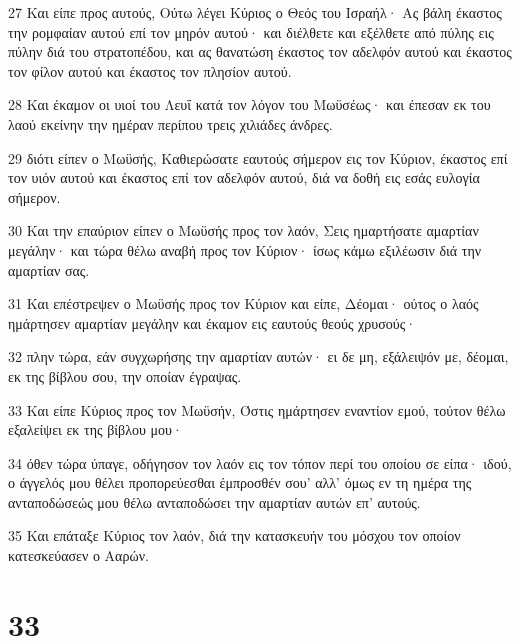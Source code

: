 \par 27 Και είπε προς αυτούς, Ούτω λέγει Κύριος ο Θεός του Ισραήλ· Ας βάλη έκαστος την ρομφαίαν αυτού επί τον μηρόν αυτού· και διέλθετε και εξέλθετε από πύλης εις πύλην διά του στρατοπέδου, και ας θανατώση έκαστος τον αδελφόν αυτού και έκαστος τον φίλον αυτού και έκαστος τον πλησίον αυτού.
\par 28 Και έκαμον οι υιοί του Λευΐ κατά τον λόγον του Μωϋσέως· και έπεσαν εκ του λαού εκείνην την ημέραν περίπου τρεις χιλιάδες άνδρες.
\par 29 διότι είπεν ο Μωϋσής, Καθιερώσατε εαυτούς σήμερον εις τον Κύριον, έκαστος επί τον υιόν αυτού και έκαστος επί τον αδελφόν αυτού, διά να δοθή εις εσάς ευλογία σήμερον.
\par 30 Και την επαύριον είπεν ο Μωϋσής προς τον λαόν, Σεις ημαρτήσατε αμαρτίαν μεγάλην· και τώρα θέλω αναβή προς τον Κύριον· ίσως κάμω εξιλέωσιν διά την αμαρτίαν σας.
\par 31 Και επέστρεψεν ο Μωϋσής προς τον Κύριον και είπε, Δέομαι· ούτος ο λαός ημάρτησεν αμαρτίαν μεγάλην και έκαμον εις εαυτούς θεούς χρυσούς·
\par 32 πλην τώρα, εάν συγχωρήσης την αμαρτίαν αυτών· ει δε μη, εξάλειψόν με, δέομαι, εκ της βίβλου σου, την οποίαν έγραψας.
\par 33 Και είπε Κύριος προς τον Μωϋσήν, Όστις ημάρτησεν εναντίον εμού, τούτον θέλω εξαλείψει εκ της βίβλου μου·
\par 34 όθεν τώρα ύπαγε, οδήγησον τον λαόν εις τον τόπον περί του οποίου σε είπα· ιδού, ο άγγελός μου θέλει προπορεύεσθαι έμπροσθέν σου' αλλ' όμως εν τη ημέρα της ανταποδώσεώς μου θέλω ανταποδώσει την αμαρτίαν αυτών επ' αυτούς.
\par 35 Και επάταξε Κύριος τον λαόν, διά την κατασκευήν του μόσχου τον οποίον κατεσκεύασεν ο Ααρών.

\chapter{33}

